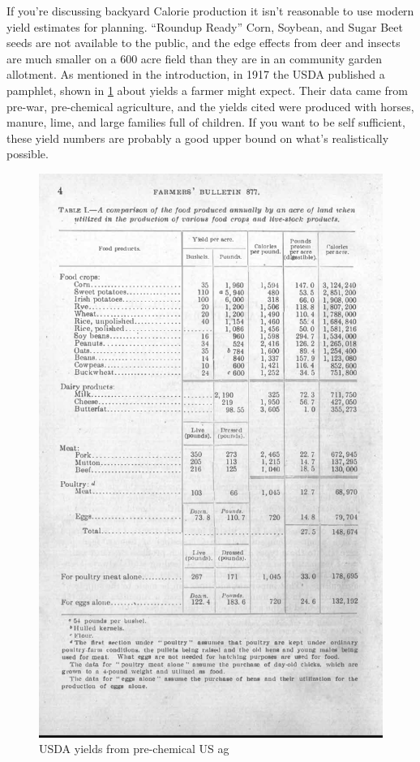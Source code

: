 \documentclass[12pt]{iopart}
\begin{document}
If you're discussing backyard Calorie production it isn't reasonable to use modern yield estimates for planning.  ``Roundup Ready'' Corn, Soybean, and Sugar Beet seeds are not available to the public, and the edge effects from deer and insects are much smaller on a $600$ acre field than they are in an community garden allotment.  As mentioned in the introduction, in 1917 the USDA published a pamphlet, shown in \ref{1917_yields} about yields a farmer might expect.  Their data came from pre-war, pre-chemical agriculture, and the yields cited were produced with horses, manure, lime, and large families full of children.  If you want to be self sufficient, these yield numbers are probably a good upper bound on what's realistically possible.  

\begin{figure}[ht!]
\centering
\includegraphics[width=\columnwidth]{USDA_1917_cropped.pdf}
\caption{
USDA yields from pre-chemical US ag
}
\label{1917_yields}
\end{figure}
\end{document}
